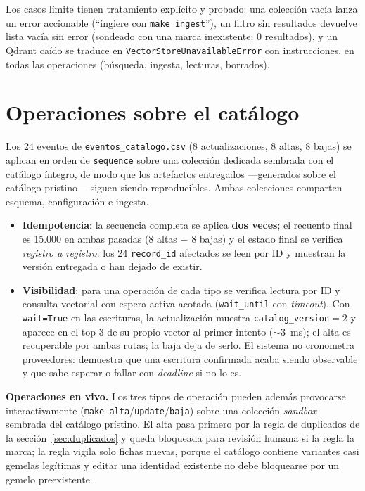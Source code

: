 \documentclass[10pt,twocolumn]{article}
\newcommand{\code}[1]{\texttt{\small #1}}
\begin{document}
Los casos límite tienen tratamiento explícito y probado: una colección vacía
lanza un error accionable (``ingiere con \code{make ingest}''), un filtro
sin resultados devuelve lista vacía sin error (sondeado con una marca
inexistente: 0 resultados), y un Qdrant caído se traduce en
\code{VectorStoreUnavailableError} con instrucciones, en todas las
operaciones (búsqueda, ingesta, lecturas, borrados).

\section{Operaciones sobre el catálogo}
\label{sec:operaciones}

Los 24 eventos de \code{eventos\_catalogo.csv} (8 actualizaciones, 8 altas,
8 bajas) se aplican en orden de \code{sequence} sobre una colección dedicada
sembrada con el catálogo íntegro, de modo que los artefactos entregados
---generados sobre el catálogo prístino--- siguen siendo reproducibles.
Ambas colecciones comparten esquema, configuración e ingesta.

\begin{itemize}
  \item \textbf{Idempotencia}: la secuencia completa se aplica \textbf{dos
  veces}; el recuento final es 15.000 en ambas pasadas ($8$ altas $-$ $8$
  bajas) y el estado final se verifica \emph{registro a registro}: los 24
  \code{record\_id} afectados se leen por ID y muestran la versión entregada
  o han dejado de existir.
  \item \textbf{Visibilidad}: para una operación de cada tipo se verifica
  lectura por ID y consulta vectorial con espera activa acotada
  (\code{wait\_until} con \emph{timeout}). Con \code{wait=True} en las
  escrituras, la actualización muestra \code{catalog\_version}${=}2$ y
  aparece en el top-3 de su propio vector al primer intento (${\sim}3$~ms);
  el alta es recuperable por ambas rutas; la baja deja de serlo. El sistema
  no cronometra proveedores: demuestra que una escritura confirmada acaba
  siendo observable y que sabe esperar o fallar con \emph{deadline} si no lo
  es.
\end{itemize}

\textbf{Operaciones en vivo.} Los tres tipos de operación pueden además
provocarse interactivamente (\code{make alta}/\code{update}/\code{baja})
sobre una colección \emph{sandbox} sembrada del catálogo prístino. El alta
pasa primero por la regla de duplicados de la
sección~\ref{sec:duplicados} y queda bloqueada para revisión humana si la
regla la marca; la regla vigila solo fichas nuevas, porque el catálogo
contiene variantes casi gemelas legítimas y editar una identidad existente
no debe bloquearse por un gemelo preexistente.
\end{document}

